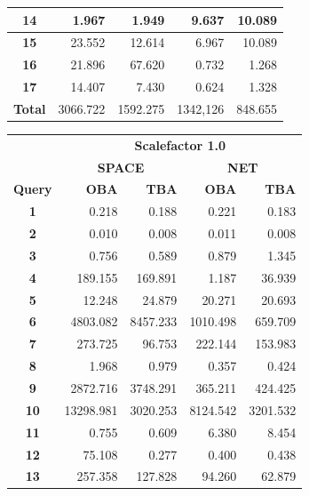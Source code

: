 \documentclass[a4paper]{article}
\begin{document}
\begin{figure}[h]
\begin{minipage}{0.5\linewidth}
\begin{tiny}
\begin{tabular}{|c|r|r|r|r|}
        \hline
        \textbf{14}&1.967&1.949&9.637&10.089\\
        \hline
        \textbf{15}&23.552&12.614&6.967&10.089\\
        \hline
        \textbf{16}&21.896&67.620&0.732&1.268\\
        \hline
        \textbf{17}&14.407&7.430&0.624&1.328\\
        \hline
        \textbf{Total}&3066.722&1592.275&1342,126&848.655\\
        \hline
      \end{tabular}
    \end{tiny}
  \end{minipage}\hfill
\begin{minipage}{0.5\linewidth}
    \begin{tiny}
      \begin{tabular}{|c|r|r|r|r|}
        \hline
        &\multicolumn{4}{c|}{\textbf{Scalefactor 1.0}}\\
        \cline{2-5}
        &\multicolumn{2}{c|}{\textbf{SPACE}}&\multicolumn{2}{c|}{\textbf{NET}}\\
        \hline
        \textbf{Query}&\textbf{OBA}&\textbf{TBA}&\textbf{OBA}&\textbf{TBA}\\
        \hline
        \textbf{1}&0.218&0.188&0.221&0.183\\
        \hline
        \textbf{2}&0.010&0.008&0.011&0.008\\
        \hline
        \textbf{3}&0.756&0.589&0.879&1.345\\
        \hline
        \textbf{4}&189.155&169.891&1.187&36.939\\
        \hline
         \textbf{5}&12.248&24.879&20.271&20.693\\
        \hline
        \textbf{6}&4803.082&8457.233&1010.498&659.709\\
        \hline
        \textbf{7}&273.725&96.753&222.144&153.983\\
        \hline
        \textbf{8}&1.968&0.979&0.357&0.424\\
        \hline
        \textbf{9}&2872.716&3748.291&365.211&424.425\\
        \hline
        \textbf{10}&13298.981&3020.253&8124.542&3201.532\\
        \hline
        \textbf{11}&0.755&0.609&6.380&8.454\\
        \hline
        \textbf{12}&75.108&0.277&0.400&0.438\\
        \hline
        \textbf{13}&257.358&127.828&94.260&62.879\\

\end{tabular}
\end{tiny}
\end{minipage}
\end{figure}
\end{document}
